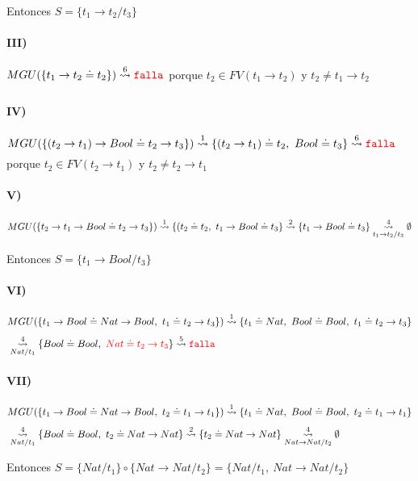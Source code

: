 \documentclass[10pt,a4paper]{article}
\begin{document}
Entonces $S = \{t_1\to t_2/t_3\}$

\paragraph{III)}$MGU(\{t_1\to t_2\doteq t_2\}) \goesTo{6}{} \falla$ porque $t_2\in FV(t_1\to t_2)$ y $t_2\neq t_1\to t_2$

\paragraph{IV)}$MGU(\{(t_2\to t_1)\to Bool\doteq t_2\to t_3\}) \goesTo{1}{} \{(t_2\to t_1)\doteq t_2,~ Bool\doteq t_3\} \goesTo{6}{} \falla$ porque $t_2\in FV(t_2\to t_1)$ y $t_2\neq t_2\to t_1$

\paragraph{V)}$MGU(\{t_2\to t_1\to Bool\doteq t_2\to t_3\}) \goesTo{1}{} \{(t_2\doteq t_2,~ t_1\to Bool\doteq t_3\} \goesTo{2}{} \{t_1\to Bool\doteq t_3\} \goesTo{4}{t_1\to t_2/t_3} \emptyset$

Entonces $S = \{t_1\to Bool/t_3\}$

\paragraph{VI)}
\begin{align*}
&MGU(\{t_1\to Bool\doteq Nat\to Bool, ~t_1\doteq t_2\to t_3\}) \goesTo{1}{} \{t_1\doteq Nat,~ Bool\doteq Bool, ~t_1\doteq t_2\to t_3\} \\
&\goesTo{4}{Nat/t_1} \{Bool\doteq Bool, ~\red{Nat\doteq t_2\to t_3}\} \goesTo{5}{} \falla
\end{align*}

\paragraph{VII)}
\begin{align*}
&MGU(\{t_1\to Bool\doteq Nat\to Bool, ~t_2\doteq t_1\to t_1\}) \goesTo{1}{} \{t_1\doteq Nat,~ Bool\doteq Bool, ~t_2\doteq t_1\to t_1\} \\
&\goesTo{4}{Nat/t_1} \{Bool\doteq Bool, ~t_2\doteq Nat\to Nat\} \goesTo{2}{} \{t_2\doteq Nat\to Nat\} \goesTo{4}{Nat\to Nat/t_2} \emptyset
\end{align*}

Entonces $S = \{Nat/t_1\} \circ \{Nat\to Nat/t_2\} = \{Nat/t_1,~Nat\to Nat/t_2\}$
\end{document}
